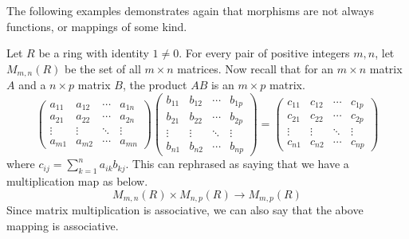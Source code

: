     The following examples demonstrates again that morphisms are not always 
    functions, or mappings of some kind.

    \begin{example}
        Let $R$ be a ring with identity $1 \ne 0$. For every pair of positive 
        integers $m, n$, let $M_{m, n}(R)$ be the set of all $m \times n$ matrices. 
        Now recall that for an $m \times n$ matrix $A$ and a $n \times p$ matrix  $B$, 
        the product $AB$ is an $m \times p$ matrix.  
        \[
            \begin{pmatrix}
                a_{11} & a_{12} & \cdots & a_{1n}\\
                a_{21} & a_{22} & \cdots & a_{2n}\\
                \vdots & \vdots & \ddots & \vdots\\
                a_{m1} & a_{m2} & \cdots & a_{mn}
            \end{pmatrix}
            \begin{pmatrix}
                b_{11} & b_{12} & \cdots & b_{1p}\\
                b_{21} & b_{22} & \cdots & b_{2p}\\
                \vdots & \vdots & \ddots & \vdots\\
                b_{n1} & b_{n2} & \cdots & b_{np}
            \end{pmatrix}  
            =
            \begin{pmatrix}
                c_{11} & c_{12} & \cdots & c_{1p}\\
                c_{21} & c_{22} & \cdots & c_{2p}\\
                \vdots & \vdots & \ddots & \vdots\\
                c_{n1} & c_{n2} & \cdots & c_{np}
            \end{pmatrix}  
        \]
        where $\displaystyle c_{ij} = \sum_{k= 1}^{n}a_{ik}b_{kj}$. This can rephrased as saying that 
        we have a multiplication map as below.
        \[
            M_{m,n}(R)\times M_{n,p}(R) \to M_{m, p}(R)
        \]
        Since matrix multiplication is associative, we can also say that the above mapping 
        is associative. 


\end{example}

